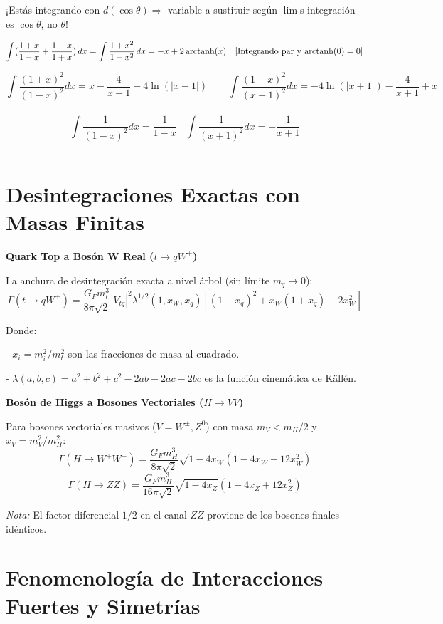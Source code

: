\color{cyan} ¡Estás integrando con $d(\cos\theta) \Rightarrow$ variable a sustituir según $\lim$s integración es $\cos\theta$, no $\theta$! \color{black}

$$\int(\frac{1+x}{1-x} + \frac{1-x}{1+x}) \, dx = \int \frac{1+x^2}{1-x^2}\, dx = -x+2 \,\mathrm{ arctanh} (x) \quad [\text{Integrando par y } \rm arctanh(0)=0]$$  



$$\int \frac{(1+x)^2}{(1-x)^2}dx= x - \frac{4}{x - 1} + 4 \ln\left(\left|x - 1\right|\right)\qquad \int \frac{\left( 1 - x\right)^{2}}{\left( x + 1\right)^{2}} dx = -4 \ln\left(\left| x + 1 \right|\right) - \frac{4}{x + 1} + x$$\\ $$ \int \frac{1}{(1-x)^2}dx=\frac{1}{1 - x}\;\;\; \int \frac{1}{\left(x + 1\right)^{2}}dx = -\frac{1}{x + 1}$$


\hrule



\section*{Desintegraciones Exactas con Masas Finitas}

\textbf{Quark Top a Bosón W Real ($t \to qW^+$)}


La anchura de desintegración exacta a nivel árbol (sin límite $m_q \to 0$):
$$\Gamma(t \to qW^+) = \frac{G_F m_t^3}{8\pi\sqrt{2}} |V_{tq}|^2 \lambda^{1/2}(1, x_W, x_q) \left[ (1-x_q)^2 + x_W(1+x_q) - 2x_W^2 \right]$$

Donde:

  - $x_i = m_i^2/m_t^2$ son las fracciones de masa al cuadrado.
  
- $\lambda(a,b,c) = a^2 + b^2 + c^2 - 2ab - 2ac - 2bc$ es la función cinemática de Källén.


\textbf{Bosón de Higgs a Bosones Vectoriales ($H \to VV$)}

Para bosones vectoriales masivos ($V = W^\pm, Z^0$) con masa $m_V < m_H/2$ y $x_V = m_V^2/m_H^2$:
$$\Gamma(H \to W^+W^-) = \frac{G_F m_H^3}{8\pi\sqrt{2}} \sqrt{1 - 4x_W} (1 - 4x_W + 12x_W^2)$$
$$\Gamma(H \to ZZ) = \frac{G_F m_H^3}{16\pi\sqrt{2}} \sqrt{1 - 4x_Z} (1 - 4x_Z + 12x_Z^2)$$

\textit{Nota:} El factor diferencial $1/2$ en el canal $ZZ$ proviene de los bosones finales idénticos.


\section*{Fenomenología de Interacciones Fuertes y Simetrías}

